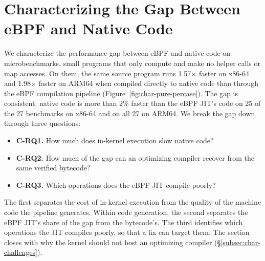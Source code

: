 
\section{Characterizing the Gap Between eBPF and Native Code}
\label{sec:characterization}

We characterize the performance gap between eBPF and native code on microbenchmarks, small programs that only compute and make no helper calls or map accesses.
On them, the same source program runs 1.57$\times$ faster on x86-64 and 1.98$\times$ faster on ARM64 when compiled directly to native code than through the eBPF compilation pipeline (Figure~\ref{fig:char-pure-percase}).
The gap is consistent: native code is more than 2\% faster than the eBPF JIT's code on 25 of the 27 benchmarks on x86-64 and on all 27 on ARM64. 
We break the gap down through three questions:
\begin{itemize}
  \item \textbf{C-RQ1.} How much does in-kernel execution slow native code?
  \item \textbf{C-RQ2.} How much of the gap can an optimizing compiler recover from the same verified bytecode?
  \item \textbf{C-RQ3.} Which operations does the eBPF JIT compile poorly?
\end{itemize}

The first separates the cost of in-kernel execution from the quality of the machine code the pipeline generates.
Within code generation, the second separates the eBPF JIT's share of the gap from the bytecode's.
The third identifies which operations the JIT compiles poorly, so that a fix can target them.
The section closes with why the kernel should not host an optimizing compiler (\S\ref{subsec:char-challenges}).

